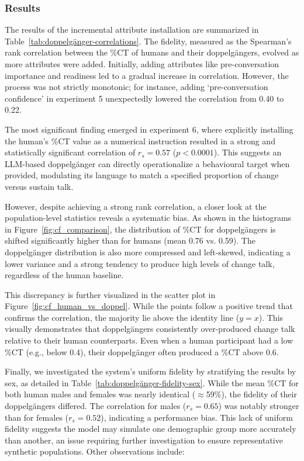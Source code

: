 \subsubsection{Results}
The results of the incremental attribute installation are summarized in Table~\ref{tab:doppelgänger-correlations}. The fidelity, measured as the Spearman's rank correlation between the \%CT of humans and their doppelgängers, evolved as more attributes were added. Initially, adding attributes like pre-conversation importance and readiness led to a gradual increase in correlation. However, the process was not strictly monotonic; for instance, adding `pre-conversation confidence' in experiment 5 unexpectedly lowered the correlation from 0.40 to 0.22.

The most significant finding emerged in experiment 6, where explicitly installing the human's \%CT value as a numerical instruction resulted in a strong and statistically significant correlation of $r_s = 0.57$ ($p < 0.0001$). This suggests an LLM-based doppelgänger can directly operationalize a behavioural target when provided, modulating its language to match a specified proportion of change versus sustain talk.

However, despite achieving a strong rank correlation, a closer look at the population-level statistics reveals a systematic bias. As shown in the histograms in Figure~\ref{fig:cf_comparison}, the distribution of \%CT for doppelgängers is shifted significantly higher than for humans (mean 0.76 vs. 0.59). The doppelgänger distribution is also more compressed and left-skewed, indicating a lower variance and a strong tendency to produce high levels of change talk, regardless of the human baseline.

This discrepancy is further visualized in the scatter plot in Figure~\ref{fig:cf_human_vs_doppel}. While the points follow a positive trend that confirms the correlation, the majority lie above the identity line ($y=x$). This visually demonstrates that doppelgängers consistently over-produced change talk relative to their human counterparts. Even when a human participant had a low \%CT (e.g., below 0.4), their doppelgänger often produced a \%CT above 0.6.

Finally, we investigated the system's uniform fidelity by stratifying the results by sex, as detailed in Table~\ref{tab:doppelgänger-fidelity-sex}. While the mean \%CT for both human males and females was nearly identical ($\approx$59\%), the fidelity of their doppelgängers differed. The correlation for males ($r_s = 0.65$) was notably stronger than for females ($r_s = 0.52$), indicating a performance bias. This lack of uniform fidelity suggests the model may simulate one demographic group more accurately than another, an issue requiring further investigation to ensure representative synthetic populations. Other observations include:

